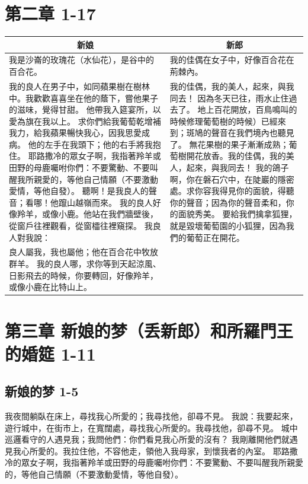 \section{第二章   1-17}
\begin{table}[H]
\centering
\begin{tabular}{p{9.5cm}|p{8.250cm}}\hline\hline
\multicolumn{1}{c|}{新娘}&\multicolumn{1}{c}{新郎}\\\hline
我是沙崙的玫瑰花（水仙花），是谷中的百合花。
&我的佳偶在女子中，好像百合花在荊棘內。\\\hline
我的良人在男子中，如同蘋果樹在樹林中。我歡歡喜喜坐在他的蔭下，嘗他果子的滋味，覺得甘甜。
他帶我入筵宴所，以愛為旗在我以上。
求你們給我葡萄乾增補我力，給我蘋果暢快我心，因我思愛成病。
他的左手在我頭下；他的右手將我抱住。
耶路撒冷的眾女子啊，我指著羚羊或田野的母鹿囑咐你們：不要驚動、不要叫醒我所親愛的，等他自己情願（不要激動愛情，等他自發）。
聽啊！是我良人的聲音；看哪！他躥山越嶺而來。
我的良人好像羚羊，或像小鹿。他站在我們牆壁後，從窗戶往裡觀看，從窗櫺往裡窺探。
我良人對我說：
&我的佳偶，我的美人，起來，與我同去！
因為冬天已往，雨水止住過去了。
地上百花開放，百鳥鳴叫的時候修理葡萄樹的時候）已經來到；斑鳩的聲音在我們境內也聽見了。
無花果樹的果子漸漸成熟；葡萄樹開花放香。我的佳偶，我的美人，起來，與我同去！
我的鴿子啊，你在磐石穴中，在陡巖的隱密處。求你容我得見你的面貌，得聽你的聲音；因為你的聲音柔和，你的面貌秀美。
要給我們擒拿狐狸，就是毀壞葡萄園的小狐狸，因為我們的葡萄正在開花。\\\hline

良人屬我，我也屬他；他在百合花中牧放群羊。
我的良人哪，求你等到天起涼風、日影飛去的時候，你要轉回，好像羚羊，或像小鹿在比特山上。&\\\hline
\end{tabular}
\end{table}


\section{第三章 新娘的梦（丢新郎）和所羅門王的婚筵 1-11}
\subsection{新娘的梦 1-5}
我夜間躺臥在床上，尋找我心所愛的；我尋找他，卻尋不見。
我說：我要起來，遊行城中，在街市上，在寬闊處，尋找我心所愛的。我尋找他，卻尋不見。
城中巡邏看守的人遇見我；我問他們：你們看見我心所愛的沒有？
我剛離開他們就遇見我心所愛的。我拉住他，不容他走，領他入我母家，到懷我者的內室。
耶路撒冷的眾女子啊，我指著羚羊或田野的母鹿囑咐你們：不要驚動、不要叫醒我所親愛的，等他自己情願（不要激動愛情，等他自發）。

